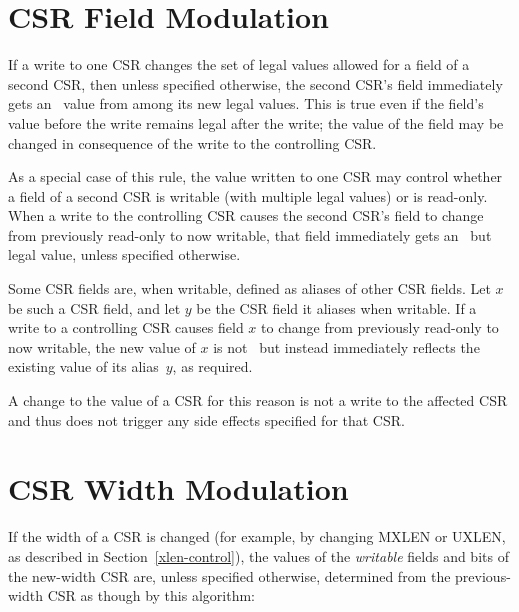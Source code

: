 \section{CSR Field Modulation}

If a write to one CSR changes the set of legal values allowed for a
field of a second CSR, then unless specified otherwise, the second
CSR's field immediately gets an \unspecified\ value from among its new
legal values.
This is true even if the field's value before the write remains legal
after the write;
the value of the field may be changed in consequence of the write to
the controlling CSR.

\begin{commentary}
As a special case of this rule, the value written to one CSR may
control whether a field of a second CSR is writable (with multiple
legal values) or is read-only.
When a write to the controlling CSR causes the second CSR's field
to change from previously read-only to now writable, that field
immediately gets an \unspecified\ but legal value, unless specified
otherwise.
\end{commentary}

\begin{commentary}
Some CSR fields are, when writable, defined as aliases of other CSR
fields.
Let $x$ be such a CSR field, and let $y$ be the CSR field it aliases
when writable.
If a write to a controlling CSR causes field $x$ to change from
previously read-only to now writable, the new value of $x$ is not
\unspecified\ but instead immediately reflects the existing value of its
alias~$y$, as required.
\end{commentary}

A change to the value of a CSR for this reason is not a write to the
affected CSR and thus does not trigger any side effects specified for
that CSR.

\section{CSR Width Modulation}
\label{sec:csrwidthmodulation}

If the width of a CSR is changed (for example, by changing MXLEN or UXLEN, as
described in Section~\ref{xlen-control}), the values of the {\em writable}
fields and bits of the new-width CSR are, unless specified otherwise,
determined from the previous-width CSR as though by this algorithm:

